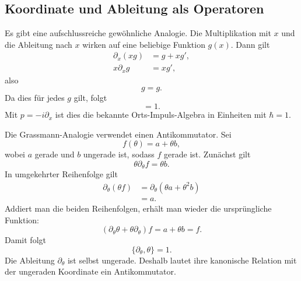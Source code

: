 \subsection{Koordinate und Ableitung als Operatoren}

Es gibt eine aufschlussreiche gewöhnliche Analogie. Die Multiplikation mit \(x\) und die Ableitung nach \(x\) wirken auf eine beliebige Funktion \(g(x)\). Dann gilt
\begin{align}
\partial_x\!\left(xg\right)&=g+xg',\\
x\partial_xg&=xg',
\end{align}
also
\begin{equation}
[\partial_x,x]g=g.
\end{equation}
Da dies für jedes \(g\) gilt, folgt
\begin{equation}
[\partial_x,x]=1.
\end{equation}
Mit \(p=-i\partial_x\) ist dies die bekannte Orts-Impuls-Algebra in Einheiten mit \(\hbar=1\).

Die Grassmann-Analogie verwendet einen Antikommutator. Sei
\begin{equation}
f(\theta)=a+\theta b,
\end{equation}
wobei \(a\) gerade und \(b\) ungerade ist, sodass \(f\) gerade ist. Zunächst gilt
\begin{equation}
\theta\partial_\theta f=\theta b.
\end{equation}
In umgekehrter Reihenfolge gilt
\begin{align}
\partial_\theta(\theta f)
&=\partial_\theta(\theta a+\theta^2b)\\
&=a.
\end{align}
Addiert man die beiden Reihenfolgen, erhält man wieder die ursprüngliche Funktion:
\begin{equation}
\left(\partial_\theta\theta+\theta\partial_\theta\right)f
=a+\theta b=f.
\end{equation}
Damit folgt
\begin{equation}
\boxed{\{\partial_\theta,\theta\}=1.}
\end{equation}
Die Ableitung \(\partial_\theta\) ist selbst ungerade. Deshalb lautet ihre kanonische Relation mit der ungeraden Koordinate ein Antikommutator.

\begin{classroomqa}
\end{classroomqa}

